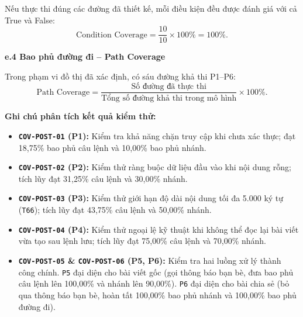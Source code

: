 \documentclass[11pt,a4paper]{article}
\begin{document}
\noindent Nếu thực thi đúng các đường đã thiết kế, mỗi điều kiện đều được đánh giá với cả True và False:
\[
\text{Condition Coverage} = \frac{10}{10} \times 100\% = 100\%.
\]

\noindent\textbf{e.4 Bao phủ đường đi -- Path Coverage}

\noindent Trong phạm vi đồ thị đã xác định, có sáu đường khả thi P1--P6:
\[
\text{Path Coverage} = \frac{\text{Số đường đã thực thi}}{\text{Tổng số đường khả thi trong mô hình}} \times 100\%.
\]

\noindent\textbf{Ghi chú phân tích kết quả kiểm thử:}
\begin{itemize}[leftmargin=1.2cm, noitemsep]
    \item[\textbf{--}] \textbf{\texttt{COV-POST-01} (P1):} Kiểm tra khả năng chặn truy cập khi chưa xác thực; đạt 18,75\% bao phủ câu lệnh và 10,00\% bao phủ nhánh.
    \item[\textbf{--}] \textbf{\texttt{COV-POST-02} (P2):} Kiểm thử ràng buộc dữ liệu đầu vào khi nội dung rỗng; tích lũy đạt 31,25\% câu lệnh và 30,00\% nhánh.
    \item[\textbf{--}] \textbf{\texttt{COV-POST-03} (P3):} Kiểm thử giới hạn độ dài nội dung tối đa 5.000 ký tự (\texttt{T66}); tích lũy đạt 43,75\% câu lệnh và 50,00\% nhánh.
    \item[\textbf{--}] \textbf{\texttt{COV-POST-04} (P4):} Kiểm thử ngoại lệ kỹ thuật khi không thể đọc lại bài viết vừa tạo sau lệnh lưu; tích lũy đạt 75,00\% câu lệnh và 70,00\% nhánh.
    \item[\textbf{--}] \textbf{\texttt{COV-POST-05} \& \texttt{COV-POST-06} (P5, P6):} Kiểm tra hai luồng xử lý thành công chính. \texttt{P5} đại diện cho bài viết gốc (gọi thông báo bạn bè, đưa bao phủ câu lệnh lên 100,00\% và nhánh lên 90,00\%). \texttt{P6} đại diện cho bài chia sẻ (bỏ qua thông báo bạn bè, hoàn tất 100,00\% bao phủ nhánh và 100,00\% bao phủ đường đi).
\end{itemize}
\end{document}

